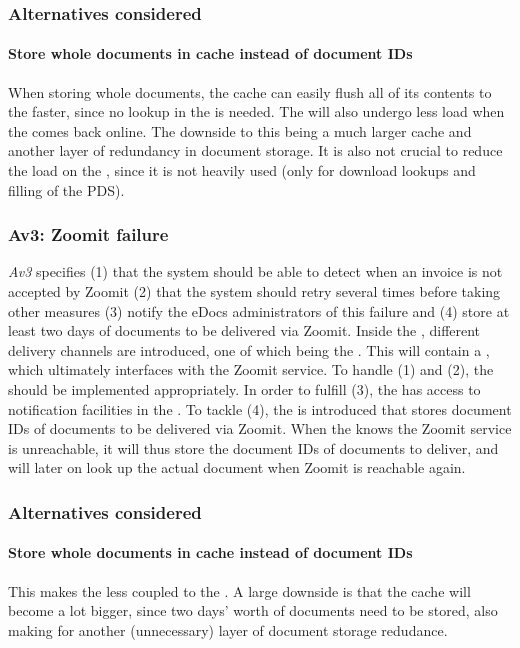 \subsubsection*{Alternatives considered}
\paragraph{Store whole documents in cache instead of document IDs} When storing whole documents, the cache can easily flush all of its contents to the  faster, since no lookup in the  is needed. The  will also undergo less load when the  comes back online. The downside to this being a much larger cache and another layer of redundancy in document storage. It is also not crucial to reduce 
the load on the , since it is not heavily used (only for download lookups and filling of the PDS).

\subsubsection{Av3: Zoomit failure}\label{march:av3}
\emph{Av3} specifies (1) that the system should be able to detect when an invoice is not accepted by Zoomit (2) that the system should retry several times before taking other measures (3) notify the eDocs administrators of this failure and (4) store at least two days of documents to be delivered via Zoomit. Inside the , different delivery channels are introduced, one of which being the . This  will contain a , which ultimately interfaces with the Zoomit service. To handle (1) and (2), the  should be implemented appropriately. In order to fulfill (3), the  has access to notification facilities in the . To tackle (4), the  is introduced that stores document IDs of documents to be delivered via Zoomit. When the  knows the Zoomit service is unreachable, it will thus store the document IDs of documents to deliver, and will later on look up the actual document when Zoomit is reachable again.

\subsubsection*{Alternatives considered}
\paragraph{Store whole documents in cache instead of document IDs} This makes the  less coupled to the . A large downside is that the cache will become a lot bigger, since two days' worth of documents need to be stored, also making for another (unnecessary) layer of document storage redudance.

